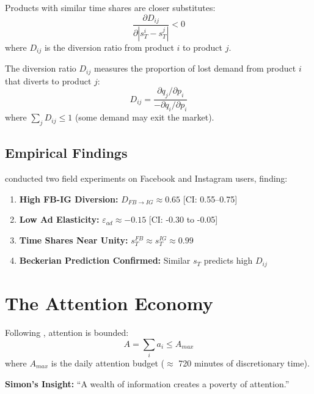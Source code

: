 \begin{axiom}
\label{ax:ta-substitution}
Products with similar time shares are closer substitutes:
\[
\frac{\partial D_{ij}}{\partial |s_T^i - s_T^j|} < 0
\]
where $D_{ij}$ is the diversion ratio from product $i$ to product $j$.
\end{axiom}

\begin{definition}
The diversion ratio $D_{ij}$ measures the proportion of lost demand from product $i$ that diverts to product $j$:
\[
D_{ij} = \frac{\partial q_j / \partial p_i}{-\partial q_i / \partial p_i}
\]
where $\sum_j D_{ij} \leq 1$ (some demand may exit the market).
\end{definition}

\subsection{Empirical Findings}

\citet{PAP-goodman2026timeintensive} conducted two field experiments on Facebook and Instagram users, finding:

\begin{tcolorbox}[colback=green!5!white, colframe=green!75!black,
    title=Key Empirical Results (Goodman et al. 2026)]
\begin{enumerate}
\item \textbf{High FB-IG Diversion:} $D_{FB \to IG} \approx 0.65$ [CI: 0.55--0.75]
\item \textbf{Low Ad Elasticity:} $\varepsilon_{ad} \approx -0.15$ [CI: -0.30 to -0.05]
\item \textbf{Time Shares Near Unity:} $s_T^{FB} \approx s_T^{IG} \approx 0.99$
\item \textbf{Beckerian Prediction Confirmed:} Similar $s_T$ predicts high $D_{ij}$
\end{enumerate}
\end{tcolorbox}

\section{The Attention Economy}
\label{sec:pt-attention}

\begin{axiom}
\label{ax:ta-attention}
Following \citet{PAP-simon1971designing}, attention is bounded:
\[
A = \sum_i a_i \leq A_{max}
\]
where $A_{max}$ is the daily attention budget ($\approx$ 720 minutes of discretionary time).

\textbf{Simon's Insight:} ``A wealth of information creates a poverty of attention.''
\end{axiom}

